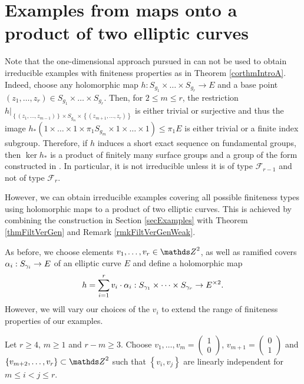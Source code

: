 \section{Examples from maps onto a product of two elliptic curves}
\label{secExCombined}
Note that the one-dimensional approach pursued in \cite{Llo-16-II} can not be used to obtain irreducible examples with finiteness properties as in Theorem \ref{corthmIntroA}. Indeed, choose any holomorphic map $h: S_{g_1}\times \dots \times S_{g_r}\to E$ and a base point $(z_1,\dots, z_r)\in S_{g_1}\times \dots \times S_{g_r}$. Then, for $2\leq m\leq r$, the restriction $h|_{\left\{(z_1,\dots,z_{m-1})\right\} \times S_{g_m}\times \left\{(z_{m+1},\dots,z_r)\right\}}$ is either trivial or surjective and thus the image $h_{\ast}(1\times \dots \times 1\times  \pi_1 S_{g_m}\times 1 \times \dots \times 1)\leq \pi_1 E$ is either trivial or a finite index subgroup. Therefore, if $h$ induces a short exact sequence on fundamental groups, then $\ker h_{\ast}$ is a product of finitely many surface groups and a group of the form constructed in \cite[Theorem 1.1]{Llo-16-II}. In particular, it is not irreducible unless it is of type $\mathcal{F}_{r-1}$ and not of type $\mathcal{F}_r$.

However, we can obtain irreducible examples covering all possible finiteness types using holomorphic maps to a product of two elliptic curves. This is achieved by combining the construction in Section \ref{secExamples} with Theorem \ref{thmFiltVerGen} and Remark \ref{rmkFiltVerGenWeak}. 

As before, we choose elements $v_1,\dots, v_r \in \ZZ^2$, as well as ramified covers $\alpha_i: S_{\gamma_i}\to E$ of an elliptic curve $E$ and define a holomorphic map 
\begin{equation}
h=\sum_{i=1}^r v_i\cdot \alpha_i : S_{\gamma_1}\times \dots \times S_{\gamma_r}\to E^{\times 2}.
\label{eqdefh}
\end{equation}
However, we will vary our choices of the $v_i$ to extend the range of finiteness properties of our examples.

Let $r\geq 4$, $m\geq 1$ and $r-m\geq 3$. Choose $v_1,\dots, v_m=\left( \begin{array}{c} 1\\ 0 \end{array} \right)$, $v_{m+1}=\left(\begin{array}{c} 0\\ 1 \end{array}\right)$ and $\left\{ v_{m+2}, \dots, v_r \right\}\subset \ZZ^2$ such that $\left\{ v_i, v_j\right\}$ are linearly independent for $m\leq i < j \leq r$. 

